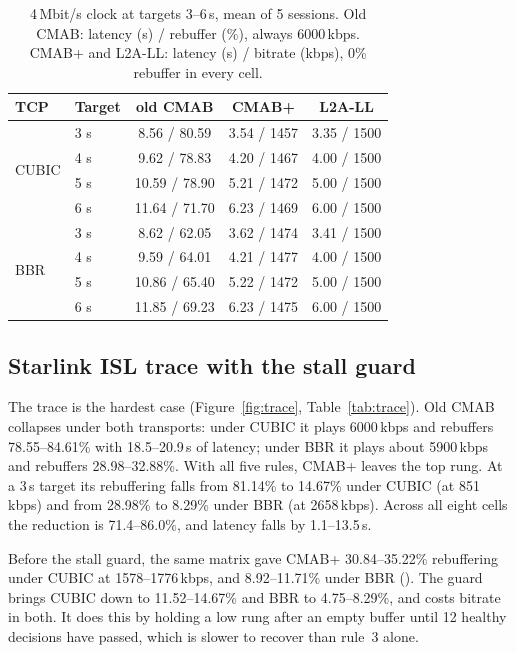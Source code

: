 \documentclass[sigconf]{acmart}
\newcommand{\cmabp}{CMAB+\xspace}
\newcommand{\kbps}{\,kbps\xspace}
\begin{document}
\begin{table}[t]
\caption{4\,Mbit/s clock at targets 3--6\,s, mean of 5 sessions. Old CMAB: latency (s) / rebuffer (\%), always 6000\kbps. CMAB+ and L2A-LL: latency (s) / bitrate (kbps), 0\% rebuffer in every cell.}
\label{tab:robust}
\footnotesize
\begin{tabular}{@{}llccc@{}}
\toprule
TCP & Target & old CMAB & CMAB+ & L2A-LL \\
\midrule
\multirow{4}{*}{CUBIC} & 3 s & 8.56 / 80.59 & 3.54 / 1457 & 3.35 / 1500 \\
 & 4 s & 9.62 / 78.83 & 4.20 / 1467 & 4.00 / 1500 \\
 & 5 s & 10.59 / 78.90 & 5.21 / 1472 & 5.00 / 1500 \\
 & 6 s & 11.64 / 71.70 & 6.23 / 1469 & 6.00 / 1500 \\
\midrule
\multirow{4}{*}{BBR} & 3 s & 8.62 / 62.05 & 3.62 / 1474 & 3.41 / 1500 \\
 & 4 s & 9.59 / 64.01 & 4.21 / 1477 & 4.00 / 1500 \\
 & 5 s & 10.86 / 65.40 & 5.22 / 1472 & 5.00 / 1500 \\
 & 6 s & 11.85 / 69.23 & 6.23 / 1475 & 6.00 / 1500 \\
\bottomrule
\end{tabular}
\end{table}

\subsection{Starlink ISL trace with the stall guard}
\label{sec:trace}

The trace is the hardest case (Figure~\ref{fig:trace}, Table~\ref{tab:trace}). Old CMAB collapses under both transports: under CUBIC it plays 6000\kbps and rebuffers 78.55--84.61\% with 18.5--20.9\,s of latency; under BBR it plays about 5900\kbps and rebuffers 28.98--32.88\%. With all five rules, \cmabp leaves the top rung. At a 3\,s target its rebuffering falls from 81.14\% to 14.67\% under CUBIC (at 851\kbps) and from 28.98\% to 8.29\% under BBR (at 2658\kbps). Across all eight cells the reduction is 71.4--86.0\%, and latency falls by 1.1--13.5\,s.

Before the stall guard, the same matrix gave \cmabp 30.84--35.22\% rebuffering under CUBIC at 1578--1776\kbps, and 8.92--11.71\% under BBR (). The guard brings CUBIC down to 11.52--14.67\% and BBR to 4.75--8.29\%, and costs bitrate in both. It does this by holding a low rung after an empty buffer until 12 healthy decisions have passed, which is slower to recover than rule~3 alone.
\end{document}
